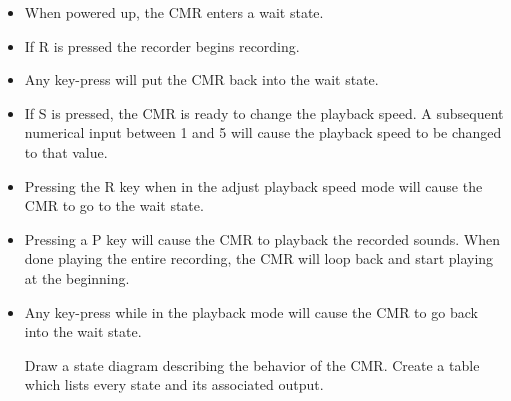 \begin{itemize}
\item
  When powered up, the CMR enters a wait state.
\item
  If \textquotesingle R\textquotesingle{} is pressed the recorder begins
  recording.
\item
  Any key-press will put the CMR back into the wait state.
\item
  If \textquotesingle S\textquotesingle{} is pressed, the CMR is ready
  to change the playback speed. A subsequent numerical input between 1
  and 5 will cause the playback speed to be changed to that value.
\item
  Pressing the \textquotesingle R\textquotesingle{} key when in the
  adjust playback speed mode will cause the CMR to go to the wait state.
\item
  Pressing a \textquotesingle P\textquotesingle{} key will cause the CMR
  to playback the recorded sounds. When done playing the entire
  recording, the CMR will loop back and start playing at the beginning.
\item
  Any key-press while in the playback mode will cause the CMR to go back
  into the wait state.

  Draw a state diagram describing the behavior of the CMR. Create a
  table which lists every state and its associated output.


\end{itemize}
